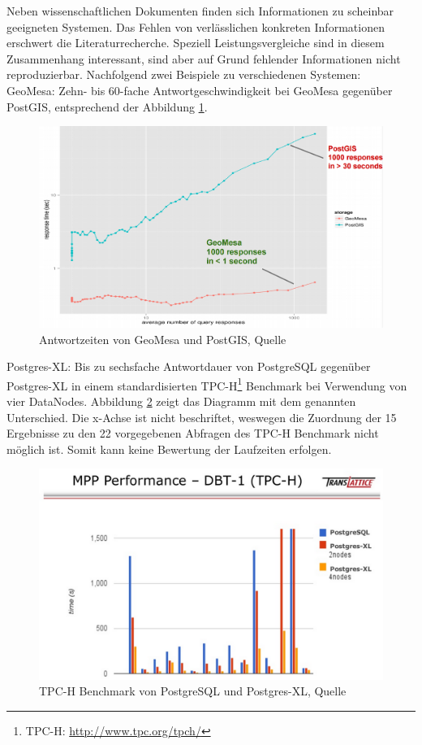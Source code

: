 Neben wissenschaftlichen Dokumenten finden sich Informationen zu scheinbar geeigneten Systemen.
Das Fehlen von verlässlichen konkreten Informationen erschwert die Literaturrecherche.
Speziell Leistungsvergleiche sind in diesem Zusammenhang interessant, sind aber auf Grund fehlender Informationen nicht reproduzierbar.
Nachfolgend zwei Beispiele zu verschiedenen Systemen:\\
GeoMesa: Zehn- bis 60-fache Antwortgeschwindigkeit bei GeoMesa gegenüber PostGIS, entsprechend der Abbildung \ref{fig:geomesaversuspostgis}.
\begin{figure}[hp]
\centering
\includegraphics[width=.8\textwidth]{Abbildungen/geomesa_versus_postgis.png}
\caption[Antwortzeiten von GeoMesa und PostGIS]{Antwortzeiten von GeoMesa und PostGIS, Quelle \cite[S.24]{website:slideshare:geomesa}}
\label{fig:geomesaversuspostgis}
\end{figure}

Postgres-XL: Bis zu sechsfache Antwortdauer von PostgreSQL gegenüber Postgres-XL in einem standardisierten TPC-H\footnote{TPC-H: \url{http://www.tpc.org/tpch/}} Benchmark bei Verwendung von vier DataNodes. \mbox{Abbildung} \ref{fig:pgxcversuspgsql} zeigt das Diagramm mit dem genannten Unterschied.
Die x-Achse ist nicht beschriftet, weswegen die Zuordnung der 15 Ergebnisse zu den 22 vorgegebenen Abfragen des TPC-H Benchmark nicht möglich ist.
Somit kann keine Bewertung der Laufzeiten erfolgen.
\begin{figure}
\centering
\includegraphics[width=.8\textwidth]{Abbildungen/postgresxl_versus_postgis.png}
\caption[TPC-H Benchmark von PostgreSQL und Postgres-XL]{TPC-H Benchmark von PostgreSQL und Postgres-XL, Quelle \cite[S.12]{website:slideshare:pgxc}}
\label{fig:pgxcversuspgsql}
\end{figure}

